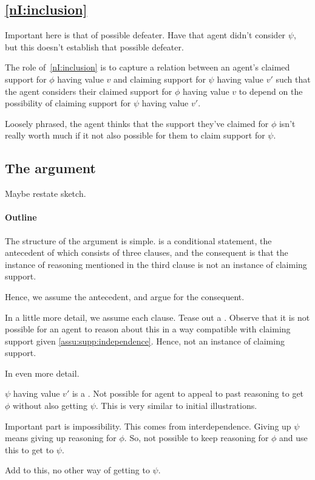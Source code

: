 \subsection{\ref{nI:inclusion}}

\begin{note}
  Important here is that of possible defeater.
  Have that agent didn't consider \(\psi\), but this doesn't establish that possible defeater.
\end{note}

\begin{note}
  The role of~\ref{nI:inclusion} is to capture a relation between an agent's claimed support for \(\phi\) having value \(v\) and claiming support for \(\psi\) having value \(v'\) such that the agent considers their claimed support for \(\phi\) having value \(v\) to depend on the possibility of claiming support for \(\psi\) having value \(v'\).

  Loosely phrased, the agent thinks that the support they've claimed for \(\phi\) isn't really worth much if it not also possible for them to claim support for \(\psi\).
\end{note}

\subsection{The argument}

\begin{note}
  \color{red}
  Maybe restate sketch.
\end{note}

\paragraph{Outline}

\begin{note}
  The structure of the argument is simple.
  \nI{} is a conditional statement, the antecedent of which consists of three clauses, and the consequent is that the instance of reasoning mentioned in the third clause is not an instance of claiming support.

  Hence, we assume the antecedent, and argue for the consequent.

  In a little more detail, we assume each clause.
  Tease out a \requ{}.
  Observe that it is not possible for an agent to reason about this in a way compatible with claiming support given \autoref{assu:supp:independence}.
  Hence, not an instance of claiming support.

  In even more detail.

  \(\psi\) having value \(v'\) is a \requ{}.
  Not possible for agent to appeal to past reasoning to get \(\phi\) without also getting \(\psi\).
  This is very similar to initial illustrations.

  Important part is impossibility.
  This comes from interdependence.
  Giving up \(\psi\) means giving up reasoning for \(\phi\).
  So, not possible to keep reasoning for \(\phi\) and use this to get to \(\psi\).

  Add to this, no other way of getting to \(\psi\).
\end{note}

